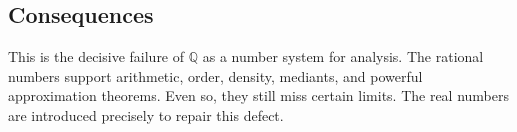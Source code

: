 \subsection{Consequences}

\begin{remark}
This is the decisive failure of $\mathbb{Q}$ as a number system for analysis.  The rational numbers
support arithmetic, order, density, mediants, and powerful approximation theorems.  Even so, they
still miss certain limits.  The real numbers are introduced precisely to repair this defect.
\end{remark}
